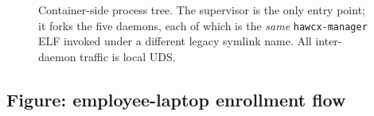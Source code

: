\documentclass[11pt, a4paper]{article}
\newcommand{\code}[1]{\texttt{\small #1}}
\begin{document}
\begin{figure}[h]
{
}
\caption{Container-side process tree. The supervisor is the only entry
point; it forks the five daemons, each of which is the \emph{same}
\code{hawcx-manager} ELF invoked under a different legacy symlink name.
All inter-daemon traffic is local UDS.}
\label{fig:container}
\end{figure}

\clearpage

\subsection{Figure: employee-laptop enrollment flow}
\end{document}

